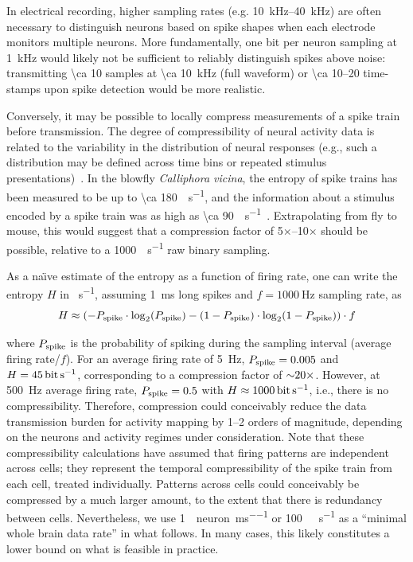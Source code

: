 In electrical recording, higher sampling rates (e.g. \SIrange{10}{40}{\kilo\hertz}) are often necessary to distinguish neurons based on spike shapes when each electrode monitors multiple neurons.
More fundamentally, one bit per neuron sampling at \SI{1}{\kilo\hertz} would likely not be sufficient to reliably distinguish spikes above noise: transmitting \SI{\ca 10}{\bit} samples at \SI{\ca 10}{\kilo\hertz} (full waveform) or \SIrange{\ca 10}{20}{\bit} time-stamps upon spike detection would be more realistic.

Conversely, it may be possible to locally compress measurements of a spike train before transmission.
The degree of compressibility of neural activity data is related to the variability in the distribution of neural responses (e.g., such a distribution may be defined across time bins or repeated stimulus presentations)~\cite{strong98}.
In the blowfly \textit{Calliphora vicina}, the entropy of spike trains has been measured to be up to \SI{\ca 180}{\bit\per\second}, and the information about a stimulus encoded by a spike train was as high as \SI{\ca 90}{\bit\per\second}~\cite{strong98}. Extrapolating from fly to mouse, this would suggest that a compression factor of 5$\times$--10$\times$ should be possible, relative to a \SI{1000}{\bit\per\second} raw binary sampling. 

As a na\"{\i}ve estimate of the entropy as a function of firing rate, one can write the entropy $H$ in \si{\bit\per\second}, assuming \SI{1}{\milli\second} long spikes and $f=\SI{1000}{\hertz}$ sampling rate, as
\[H \approx \left(-P_{\text{\scriptsize spike}}\cdot\log_2\!\left(P_{\text{\scriptsize spike}}\right) - \left(1 - P_{\text{\scriptsize spike}}\right)\cdot\log_2\!\left(1 - P_{\text{\scriptsize spike}}\right)\right) \cdot f\]

where $P_{\text{\scriptsize spike}}$ is the probability of spiking during the sampling interval (average firing rate/$f$).
For an average firing rate of \SI{5}{\hertz}, $P_{\text{\scriptsize spike}}=0.005$ and $H=\SI{45}{\bit\per\second}$, corresponding to a compression factor of ${\sim} 20\times$.
However, at \SI{500}{\hertz} average firing rate, $P_{\text{\scriptsize spike}}=0.5$ with $H\approx\SI{1000}{\bit\per\second}$, i.e., there is no compressibility. 
Therefore, compression could conceivably reduce the data transmission burden for activity mapping by 1--2 orders of magnitude, depending on the neurons and activity regimes under consideration. Note that these compressibility calculations have assumed that firing patterns are independent across cells; they represent the temporal compressibility of the spike train from each cell, treated individually. Patterns across cells could conceivably be compressed by a much larger amount, to the extent that there is redundancy between cells. Nevertheless, we use \SI{1}{\bit\per neuron\per\milli\second} or \SI{100}{\giga\bit\per\second} as a ``minimal whole brain data rate'' in what follows.
In many cases, this likely constitutes a lower bound on what is feasible in practice.

